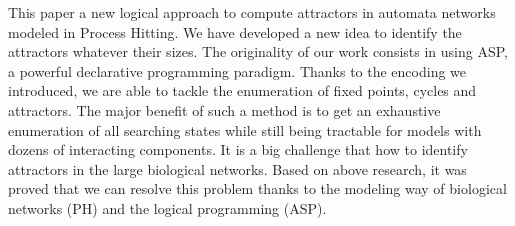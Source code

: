 This paper a new logical approach to compute attractors in automata networks modeled in Process Hitting. We have developed a new idea to identify the attractors whatever their sizes. The originality of our work consists in using ASP, a powerful declarative programming paradigm. Thanks to the encoding we introduced, we are able to tackle the enumeration of fixed points, cycles and attractors. The major benefit of such a method is to get an exhaustive enumeration of all searching states while still being tractable for models with dozens of interacting components. It is a big challenge that how to identify attractors in the large biological networks. Based on above research, it was proved that we can resolve this problem thanks to the modeling way of biological networks (PH) and the logical programming (ASP).



%
